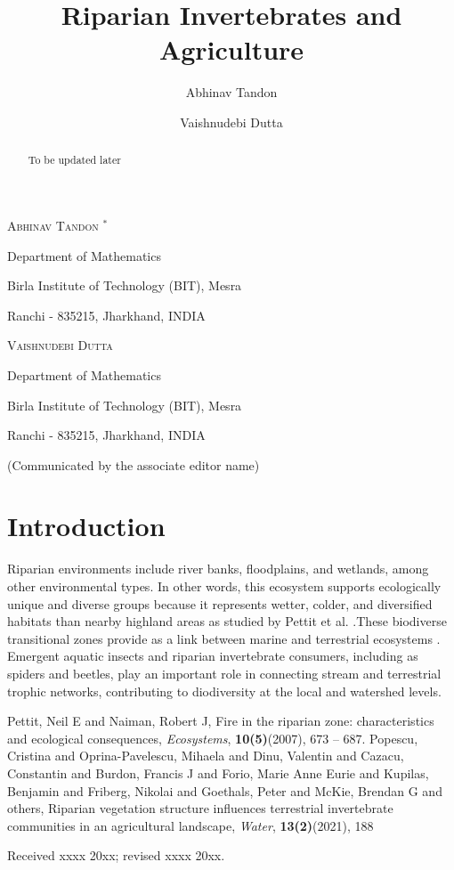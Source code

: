 \documentclass{aims}
\title[RIPARIAN-AGRICULTURE-INVERTEBRATES INTERACTIVE DYNAMICS] %
      {Riparian Invertebrates and Agriculture}
\author{
Abhinav Tandon
\and
Vaishnudebi Dutta{}}
\theoremstyle{definition}
\begin{document}
\maketitle

\centerline{\scshape Abhinav Tandon $^*$}
\medskip
{\footnotesize
 \centerline{Department of Mathematics}
   \centerline{Birla Institute of Technology (BIT), Mesra}
   \centerline{Ranchi - 835215, Jharkhand, INDIA}
} %

\medskip

\centerline{\scshape Vaishnudebi Dutta}
\medskip
{\footnotesize
 \centerline{Department of Mathematics}
   \centerline{Birla Institute of Technology (BIT), Mesra}
   \centerline{Ranchi - 835215, Jharkhand, INDIA}
}

\bigskip

 \centerline{(Communicated by the associate editor name)}


\begin{abstract}
To be updated later
\end{abstract}
\section{Introduction}
Riparian environments include river banks, floodplains, and wetlands, among other environmental types. In other words, this ecosystem supports ecologically unique and diverse groups because it represents wetter, colder, and diversified habitats than nearby highland areas as studied by Pettit et al. \cite{pettit2007fire}.These biodiverse transitional zones provide as a link between marine and terrestrial ecosystems \cite{popescu2021riparian}. Emergent aquatic insects and riparian invertebrate consumers, including as spiders and beetles, play an important role in connecting stream and terrestrial trophic networks, contributing to diodiversity at the local and watershed levels. \\

\begin{thebibliography}{99}
  \newblock Pettit, Neil E and Naiman, Robert J,
  \newblock Fire in the riparian zone: characteristics and ecological consequences,
  \newblock \emph{Ecosystems}, \textbf{10(5)}(2007), 673 -- 687.
  \newblock Popescu, Cristina and Oprina-Pavelescu, Mihaela and Dinu, Valentin and Cazacu, Constantin and Burdon, Francis J and Forio, Marie Anne Eurie and Kupilas, Benjamin and Friberg, Nikolai and Goethals, Peter and McKie, Brendan G and others,
  \newblock Riparian vegetation structure influences terrestrial invertebrate communities in an agricultural landscape,
  \newblock \emph{Water}, \textbf{13(2)}(2021), 188
\end{thebibliography}

\medskip
Received xxxx 20xx; revised xxxx 20xx.
\medskip
\end{document}
